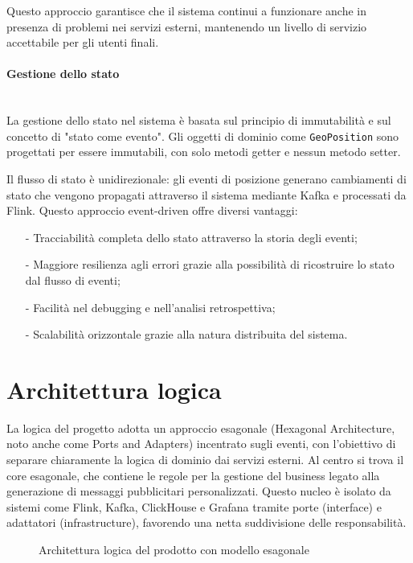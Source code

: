 \documentclass[10pt]{article}
\newcommand{\myparagraph}[1]{\paragraph{#1}\mbox{}\\}
\begin{document}
    Questo approccio garantisce che il sistema continui a funzionare anche in presenza di problemi nei servizi esterni, mantenendo un livello di servizio accettabile per gli utenti finali.

    \myparagraph{Gestione dello stato}
    La gestione dello stato nel sistema è basata sul principio di immutabilità e sul concetto di "stato come evento". Gli oggetti di dominio come \texttt{GeoPosition} sono progettati per essere immutabili, con solo metodi getter e nessun metodo setter.

    Il flusso di stato è unidirezionale: gli eventi di posizione generano cambiamenti di stato che vengono propagati attraverso il sistema mediante Kafka e processati da Flink. Questo approccio event-driven offre diversi vantaggi:
    \begin{itemize}
        \item[-] Tracciabilità completa dello stato attraverso la storia degli eventi;
        \item[-] Maggiore resilienza agli errori grazie alla possibilità di ricostruire lo stato dal flusso di eventi;
        \item[-] Facilità nel debugging e nell'analisi retrospettiva;
        \item[-] Scalabilità orizzontale grazie alla natura distribuita del sistema.
    \end{itemize}

    \section{Architettura logica}

    La logica del progetto adotta un approccio esagonale (Hexagonal Architecture, noto anche come Ports and Adapters) incentrato sugli eventi, con l'obiettivo di separare chiaramente la logica di dominio dai servizi esterni. Al centro si trova il core esagonale, che contiene le regole per la gestione del business legato alla generazione di messaggi pubblicitari personalizzati. Questo nucleo è isolato da sistemi come Flink, Kafka, ClickHouse e Grafana tramite porte (interface) e adattatori (infrastructure), favorendo una netta suddivisione delle responsabilità.

    \begin{figure}[h]
    \centering
    \caption{Architettura logica del prodotto con modello esagonale}
    \end{figure}
\end{document}
